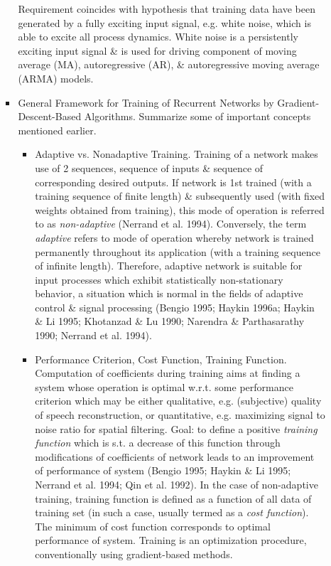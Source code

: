 \documentclass{article}
\begin{document}
\begin{enumerate}
\begin{itemize}
\begin{itemize}
			Requirement coincides with hypothesis that training data have been generated by a fully exciting input signal, e.g. white noise, which is able to excite all process dynamics. White noise is a persistently exciting input signal \& is used for driving component of moving average (MA), autoregressive (AR), \& autoregressive moving average (ARMA) models.
			\item {\sf General Framework for Training of Recurrent Networks by Gradient-Descent-Based Algorithms.} Summarize some of important concepts mentioned earlier.
			\begin{itemize}
				\item {\sf Adaptive vs. Nonadaptive Training.} Training of a network makes use of 2 sequences, sequence of inputs \& sequence of corresponding desired outputs. If network is 1st trained (with a training sequence of finite length) \& subsequently used (with fixed weights obtained from training), this mode of operation is referred to as {\it non-adaptive} (Nerrand et al. 1994). Conversely, the term {\it adaptive} refers to mode of operation whereby network is trained permanently throughout its application (with a training sequence of infinite length). Therefore, adaptive network is suitable for input processes which exhibit statistically non-stationary behavior, a situation which is normal in the fields of adaptive control \& signal processing (Bengio 1995; Haykin 1996a; Haykin \& Li 1995; Khotanzad \& Lu 1990; Narendra \& Parthasarathy 1990; Nerrand et al. 1994).
				\item {\sf Performance Criterion, Cost Function, Training Function.} Computation of coefficients during training aims at finding a system whose operation is optimal w.r.t. some performance criterion which may be either qualitative, e.g. (subjective) quality of speech reconstruction, or quantitative, e.g. maximizing signal to noise ratio for spatial filtering. Goal: to define a positive {\it training function} which is s.t. a decrease of this function through modifications of coefficients of network leads to an improvement of performance of system (Bengio 1995; Haykin \& Li 1995; Nerrand et al. 1994; Qin et al. 1992). In the case of non-adaptive training, training function is defined as a function of all data of training set (in such a case, usually termed as a {\it cost function}). The minimum of cost function corresponds to optimal performance of system. Training is an optimization procedure, conventionally using gradient-based methods.
				

\end{itemize}
\end{itemize}
\end{itemize}
\end{enumerate}
\end{document}
